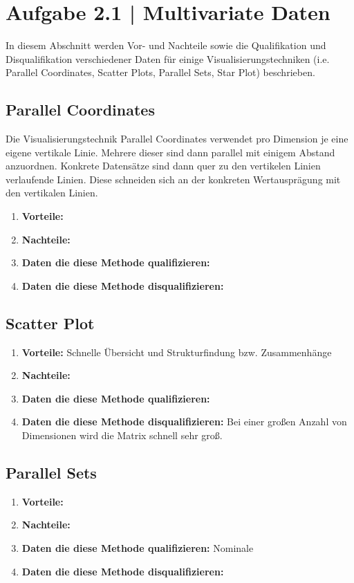 \documentclass[a4paper,12pt,ngerman]{scrartcl}
\begin{document}
\pagestyle{fancy} %

\section{Aufgabe 2.1 | Multivariate Daten}
In diesem Abschnitt werden Vor- und Nachteile sowie die Qualifikation und Disqualifikation verschiedener Daten für einige Visualisierungstechniken (i.e. Parallel Coordinates, Scatter Plots, Parallel Sets, Star Plot) beschrieben.

\subsection*{Parallel Coordinates}
Die Visualisierungstechnik Parallel Coordinates verwendet pro Dimension je eine eigene vertikale Linie. Mehrere dieser sind dann parallel mit einigem Abstand anzuordnen. Konkrete Datensätze sind dann quer zu den vertikelen Linien verlaufende Linien. Diese schneiden sich an der konkreten Wertausprägung mit den vertikalen Linien.

\begin{enumerate}
	\item \textbf{Vorteile:}
	\item \textbf{Nachteile:}
	\item \textbf{Daten die diese Methode qualifizieren:}
	\item \textbf{Daten die diese Methode disqualifizieren:}
\end{enumerate}

\subsection*{Scatter Plot}
\blindtext
\begin{enumerate}
	\item \textbf{Vorteile:} Schnelle Übersicht und Strukturfindung bzw. Zusammenhänge
	\item \textbf{Nachteile:}
	\item \textbf{Daten die diese Methode qualifizieren:}
	\item \textbf{Daten die diese Methode disqualifizieren:} Bei einer großen Anzahl von Dimensionen wird die Matrix schnell sehr groß.
\end{enumerate}

\subsection*{Parallel Sets}
\blindtext
\begin{enumerate}
	\item \textbf{Vorteile:}
	\item \textbf{Nachteile:}
	\item \textbf{Daten die diese Methode qualifizieren:} Nominale
	\item \textbf{Daten die diese Methode disqualifizieren:}
\end{enumerate}
\end{document}
